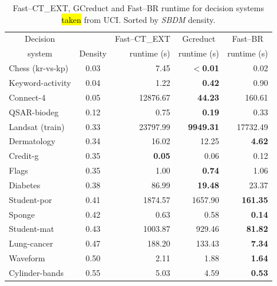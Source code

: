 \documentclass[number,preprint,review,12pt]{elsarticle}
\begin{document}
	\begin{table}[htb]
		\centering \footnotesize
		\caption{Fast--CT\_EXT, GCreduct and Fast--BR runtime for decision systems \hl{taken} from UCI. Sorted by \textit{SBDM} density.}
		\label{tab:density}
		\begin{tabular}{|l|c|r|r|r|}
			\hline
			\multicolumn{1}{|c|}{Decision}  && Fast--CT\_EXT & \multicolumn{1}{c|}{Gcreduct} & \multicolumn{1}{c|}{Fast--BR}  \\
			\multicolumn{1}{|c|}{system}       & Density & runtime (s) & runtime (s)  & runtime (s)  \\
			\hline
			Chess (kr-vs-kp)          & 0.03    & 7.45          & \textbf{$<$0.01} & 0.02            \\
			Keyword-activity          & 0.04    & 1.22          & \textbf{0.42}    & 0.90            \\
			Connect-4                 & 0.05    & 12876.67      & \textbf{44.23}   & 160.61          \\
			QSAR-biodeg               & 0.12    & 0.75          & \textbf{0.19}    & 0.33            \\
			Landsat (train)           & 0.33    & 23797.99      & \textbf{9949.31} & 17732.49        \\
			Dermatology               & 0.34    & 16.02         & 12.25            & \textbf{4.62}   \\
			Credit-g                  & 0.35    & \textbf{0.05} & 0.06             & 0.12            \\
			Flags                     & 0.35    & 1.00          & \textbf{0.74}    & 1.06            \\
			Diabetes                  & 0.38    & 86.99         & \textbf{19.48}   & 23.37           \\
			Student-por               & 0.41    & 1874.57       & 1657.90          & \textbf{161.35} \\
			Sponge                    & 0.42    & 0.63          & 0.58             & \textbf{0.14}   \\
			Student-mat               & 0.43    & 1003.87       & 929.46           & \textbf{81.82}  \\
			Lung-cancer               & 0.47    & 188.20        & 133.43           & \textbf{7.34}   \\
			Waveform                  & 0.50    & 2.11          & 1.88             & \textbf{1.64}   \\
			Cylinder-bands            & 0.55    & 5.03          & 4.59             & \textbf{0.53}   \\
			\hline
		\end{tabular}
	\end{table}
	
\end{document}
